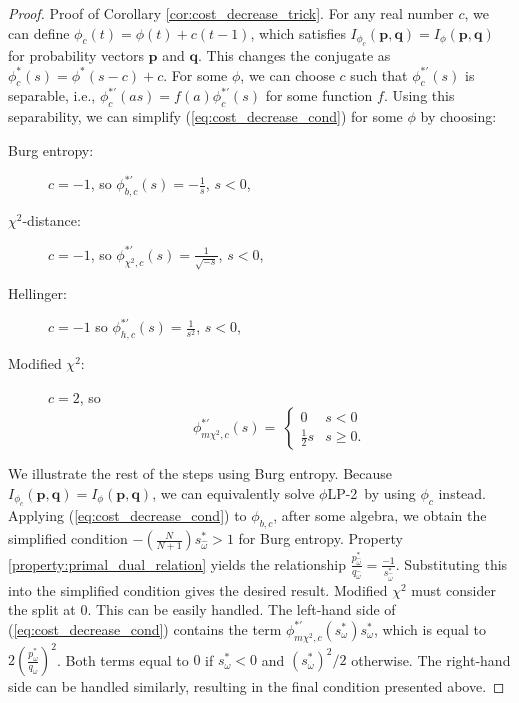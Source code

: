 \documentclass[opre,nonblindrev]{informs3} %
\newcommand{\q}{\mathbf{q}}
\newcommand{\p}{\mathbf{p}}
\newcommand{\plp}{$\phi$LP-2}
\begin{document}
\begin{proof}{\sc Proof of Corollary \ref{cor:cost_decrease_trick}.}
	For any real number $c$, we can define $\phi_c(t) = \phi(t) + c(t-1)$, which satisfies $I_{\phi_c}(\p,\q) = I_\phi(\p,\q)$ for probability vectors $\p$ and $\q$.
	This changes the conjugate as $\phi_c^*(s) = \phi^*(s-c) + c$.
	For some $\phi$, we can choose $c$ such that $\phi_c^{*\prime}(s)$ is separable, i.e., $\phi_c^{*\prime}(as) = f(a) \phi_c^{*\prime}(s)$ for some function $f$.
	Using this separability, we can simplify (\ref{eq:cost_decrease_cond}) for some $\phi$ by choosing:\vspace*{-0.15in}
	\begin{multicols}{2}
	\begin{description} 
		\item[Burg entropy:]  $c = -1$, so $\phi^{*\prime}_{b,c}(s) = -\frac{1}{s}$,  $s<0$,
		\item[$\chi^2$-distance:] $c = -1$, so $\phi^{*\prime}_{\chi^2, c}(s) = \frac{1}{\sqrt{-s}}$, $s<0$,
		\item[Hellinger:]  $c = -1$ so $\phi^{*\prime}_{h,c}(s) = \frac{1}{s^2}$,  $s<0$,
		\item[Modified $\chi^2$:] $c = 2$, so
		\[
			\phi^{*\prime}_{m\chi^2, c}(s) = \
			\begin{cases}
				0 					&  s < 0 \\
				\frac{1}{2} s 	&  s \geq 0.
			\end{cases}
		\]
	\end{description}
	\end{multicols}
	\noindent We illustrate the rest of the steps using Burg entropy. 
	Because $I_{\phi_c}(\p,\q) = I_\phi(\p,\q)$, we can equivalently solve \plp\ by using $\phi_c$ instead. 
	Applying (\ref{eq:cost_decrease_cond}) to $\phi_{b,c}$, after some algebra, we obtain the simplified condition $- \left( \frac{N}{N+1} \right)s_{\hat{\omega}}^* >1$ for Burg entropy. 
	Property \ref{property:primal_dual_relation} yields the relationship $\frac{p^*_{\hat{\omega}}}{q_{\hat{\omega}}}=\frac{-1}{s_{\hat{\omega}}^*}$. 
	Substituting this into the simplified condition gives the desired result. 
	Modified $\chi^{2}$ must consider the split at $0$. 
	This can be easily handled. 
	The left-hand side of (\ref{eq:cost_decrease_cond}) contains the term  $\phi^{*\prime}_{m\chi^2, c}(s_{\omega}^*)s_{\omega}^*$, which is equal to $2\left(\frac{p_{\omega}^*}{q_\omega}\right)^2$.  
	Both terms equal to $0$ if $s_{\omega}^* < 0$ and $(s_{\omega}^*)^2/2$ otherwise.  
	The right-hand side can be handled similarly, resulting in the final condition presented above. 
	\Halmos
\end{proof}
\end{document}
